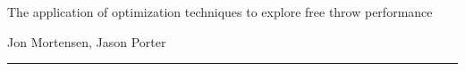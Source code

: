 \documentclass[A4]{article}
\newcommand\myfigure[6]{%
  
  \ifdim#2>.8\linewidth    
    {%
	  \centering
      \texttt{[image: \#4]}%
      \captionof{#5}{#6}%
    }%
  \else
  \begin{wrapfigure}{#1}{#2}
    \texttt{[image: \#4]}
    \caption{#5}
  \end{wrapfigure}
  \fi
  
}
\begin{document}
	\begin{center}
	\Huge The application of optimization techniques to explore free throw performance
	
	\normalsize Jon Mortensen, Jason Porter\\
	\textcolor{NavyBlue}
	{\hrule}
\end{center}	
	
	
	

	\newpage
	
	
	
	
	
	
	
	
\myfigure{L}{\linewidth}{\linewidth}{3D_arm}{figure}{A Picture}




	
\end{document}
